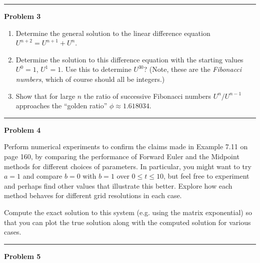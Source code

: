 \documentclass[10pt]{article}
\begin{document}



\vskip 1cm
\hrule
{\bf Problem 3}

\begin{enumerate}
\item Determine the general solution to the linear difference equation
$U^{n+2} = U^{n+1} + U^n$.

\item Determine the solution to this difference equation with the starting
values $U^0=1$, $U^1=1$.  Use this to determine $U^{30}$?  
(Note, these are the {\em Fibonacci numbers}, which of course should all be
integers.)

\item Show that for large $n$ the ratio of successive Fibonacci numbers
$U^n/U^{n-1}$ approaches the ``golden ratio'' $\phi \approx 1.618034$.
\end{enumerate} 





\newpage
\hrule
{\bf Problem 4}


Perform numerical experiments to confirm the claims made in Example 7.11 on
page 160, by comparing the performance of Forward Euler and the Midpoint
methods for different choices of parameters.  In particular, you might want
to try $a=1$ and compare $b=0$ with $b=1$ over $0\leq t \leq 10$, but feel
free to experiment and perhaps find other values that illustrate this better.
Explore how each method behaves for different grid resolutions in each case.

Compute the exact solution to this system (e.g. using the matrix
exponential) so that you can plot the true solution along with the computed
solution for various cases.




\vskip 1cm
\hrule
{\bf Problem 5}
\end{document}
